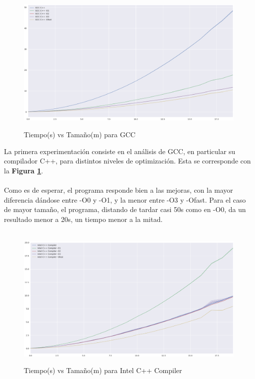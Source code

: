 \begin{figure}[!htbp]
\caption{Tiempo(s) vs Tamaño(m) para GCC}
\includegraphics[width=\textwidth]{imagenes/plot_cpp.png}
\label{fig:plot_cpp}
\end{figure}

La primera experimentación consiste en el análisis de GCC, en particular su compilador C++, para distintos niveles de optimización. Esta se corresponde con la \textbf{Figura \ref{fig:plot_cpp}}.
~\\
~\\
Como es de esperar, el programa responde bien a las mejoras, con la mayor diferencia dándose entre -O0 y -O1, y la menor entre -O3 y -Ofast. Para el caso de mayor tamaño, el programa, distando de tardar casi 50s como en -O0, da un resultado menor a 20s, un tiempo menor a la mitad.
~\\
~\\
\begin{figure}[!htbp]
\caption{Tiempo(s) vs Tamaño(m) para Intel C++ Compiler}
\includegraphics[width=\textwidth]{imagenes/plot_icc.png}
\label{fig:plot_icc}
\end{figure}

